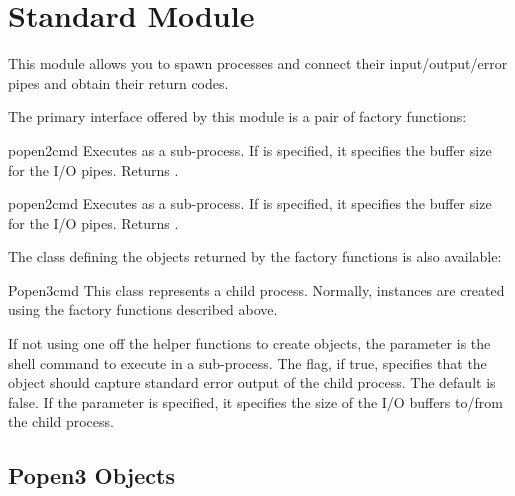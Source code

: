 
\section{Standard Module }



This module allows you to spawn processes and connect their 
input/output/error pipes and obtain their return codes.

The primary interface offered by this module is a pair of factory
functions:

\begin{funcdesc}{popen2}{cmd}
Executes  as a sub-process.  If  is specified, 
it specifies the buffer size for the I/O pipes.  Returns
.
\end{funcdesc}

\begin{funcdesc}{popen2}{cmd}
Executes  as a sub-process.  If  is specified, 
it specifies the buffer size for the I/O pipes.  Returns
.
\end{funcdesc}

The class defining the objects returned by the factory functions is
also available:

\begin{classdesc}{Popen3}{cmd}
This class represents a child process.  Normally, 
instances are created using the factory functions described above.

If not using one off the helper functions to create 
objects, the parameter  is the shell command to execute in a
sub-process.  The  flag, if true, specifies that
the object should capture standard error output of the child process.
The default is false.  If the  parameter is specified, it
specifies the size of the I/O buffers to/from the child process.
\end{classdesc}


\subsection{Popen3 Objects}
\label{popen3-objects}

